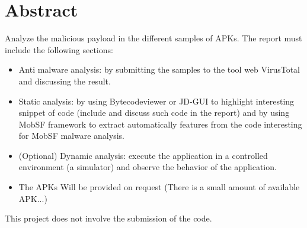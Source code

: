 \chapter*{Abstract}
Analyze the malicious payload in the different samples of APKs.
The report must include the following sections:
\begin{itemize}
    \item Anti malware analysis: by submitting the samples to the tool web VirusTotal and discussing the result.
\item Static analysis: by using Bytecodeviewer or JD-GUI to highlight interesting snippet of code (include and discuss such code in the report) and by using MobSF framework to extract automatically features from the code interesting for MobSF malware analysis.
\item (Optional) Dynamic analysis: execute the application in a controlled environment (a simulator) and observe the behavior of the application.
\item The APKs Will be provided on request (There is a small amount of available APK...)
\end{itemize}

This project does not involve the submission of the code.